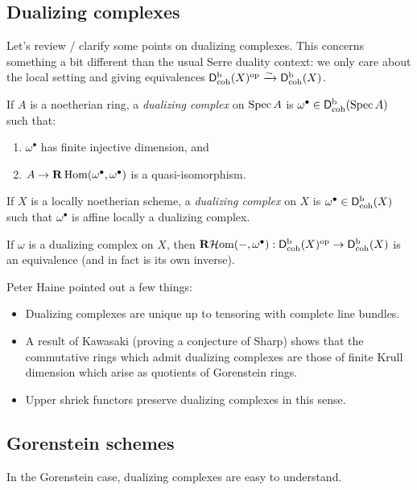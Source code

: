 \documentclass{article}
\begin{document}
\subsection{Dualizing complexes}

Let's review / clarify some points on dualizing complexes.
This concerns something a bit different than the usual Serre duality context: we only care about the local setting and giving equivalences $\mathsf{D}^\mathrm{b}_{\mathrm{coh}}(X)^{\mathrm{op}} \xrightarrow{\sim} \mathsf{D}^\mathrm{b}_{\mathrm{coh}}(X)$.

\begin{dfn}
	If $A$ is a noetherian ring, a \emph{dualizing complex} on $\operatorname{Spec} A$ is $\omega^\bullet \in \mathsf{D}^\mathrm{b}_{\mathrm{coh}}(\operatorname{Spec} A)$ such that:
	\begin{enumerate}
		\item $\omega^\bullet$ has finite injective dimension, and
		\item $A \to \mathbf{R}\operatorname{Hom}(\omega^\bullet, \omega^\bullet)$ is a quasi-isomorphism.
	\end{enumerate}
	If $X$ is a locally noetherian scheme, a \emph{dualizing complex} on $X$ is $\omega^\bullet \in \mathsf{D}^\mathrm{b}_{\mathrm{coh}}(X)$ such that $\omega^\bullet$ is affine locally a dualizing complex.
\end{dfn}

If $\omega$ is a dualizing complex on $X$, then $\mathbf{R}\mathcal{H}\mkern-3mu\operatorname{om}(-, \omega^\bullet): \mathsf{D}^\mathrm{b}_{\mathrm{coh}}(X)^{\mathrm{op}} \to \mathsf{D}^\mathrm{b}_{\mathrm{coh}}(X)$ is an equivalence (and in fact is its own inverse).

\begin{rmk}
	Peter Haine pointed out a few things:
	\begin{itemize}
		\item Dualizing complexes are unique up to tensoring with complete line bundles.
		\item A result of Kawasaki (proving a conjecture of Sharp) shows that the commutative rings which admit dualizing complexes are those of finite Krull dimension which arise as quotients of Gorenstein rings.
		\item Upper shriek functors preserve dualizing complexes in this sense.
	\end{itemize}
\end{rmk}

\subsection{Gorenstein schemes}

In the Gorenstein case, dualizing complexes are easy to understand.
\end{document}
